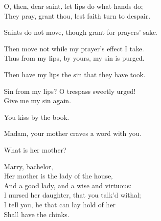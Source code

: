 \begin{speech}
O, then, dear saint, let lips do what hands do; \\

They pray, grant thou, lest faith turn to despair. \\
\end{speech}
\begin{speech}
Saints do not move, though grant for prayers' sake.
\\
\end{speech}
\begin{speech}
Then move not while my prayer's effect I take. \\

Thus from my lips, by yours, my sin is purged. \\
\end{speech}
\begin{speech}
Then have my lips the sin that they have took. \\

\end{speech}
\begin{speech}
Sin from my lips?   O trespass sweetly urged! \\
Give me my sin again. \\
\end{speech}
\begin{speech}
You kiss by the book. \\
\end{speech}
\begin{speech}
Madam, your mother craves a word with you. \\
\end{speech}
\begin{speech}
What is her mother? \\
\end{speech}
\begin{speech}
Marry, bachelor, \\
Her mother is the lady of the house, \\
And a good lady, and a wise and virtuous: \\
I nursed her daughter, that you talk'd withal; \\
I tell you, he that can lay hold of her \\
Shall have the chinks. \\
\end{speech}
